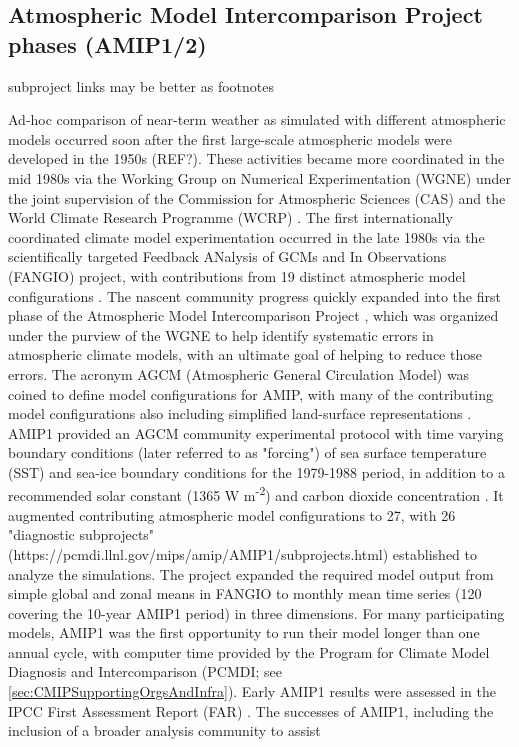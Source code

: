 \documentclass[gmd, preprint]{copernicus}
\newcommand{\mycomment}[1]{}
\def\cred#1{{\color{red}#1}}
\begin{document}
\mycomment{
1955-65: Establishment of Atmospheric General Circulation Modelling
http://pne.people.si.umich.edu/sloan/1955_65.html
Establishment of the IPCC UNEP 70th plenary meeting 6 December 1988
https://documents.un.org/doc/resolution/gen/nr0/530/32/img/nr053032.pdf?OpenElement
}

\subsection{Atmospheric Model Intercomparison Project phases (AMIP1/2)}
\label{sec:amip1And2}
\cred{subproject links may be better as footnotes}

Ad-hoc comparison of near-term weather as simulated with different atmospheric models occurred soon after the first large-scale atmospheric models were developed in the 1950s (REF?).  These activities became more coordinated in the mid 1980s via the Working Group on Numerical Experimentation (WGNE) under the joint supervision of the Commission for Atmospheric Sciences (CAS) and the World Climate Research Programme (WCRP) \citep{gates_ams_1992}. The first internationally coordinated climate model experimentation occurred in the late 1980s via the scientifically targeted Feedback ANalysis of GCMs and In Observations (FANGIO) project, with contributions from 19 distinct atmospheric model configurations \citep{cess_methodology_1988, cess_interpretation_1989, cess_intercomparison_1990, cess_first_1991}. The nascent community progress quickly expanded into the first phase of the Atmospheric Model Intercomparison Project \citep[AMIP, hereafter referred to as AMIP1;][]{gates_amip_1992}, which was organized under the purview of the WGNE to help identify systematic errors in atmospheric climate models, with an ultimate goal of helping to reduce those errors. The acronym AGCM (Atmospheric General Circulation Model) was coined to define model configurations for AMIP, with many of the contributing model configurations also including simplified land-surface representations \citep[e.g.,][]{budyko_heat_1961,manabe_climate_1969,vargas_godoy_global_2021}. AMIP1 provided an AGCM community experimental protocol with time varying boundary conditions (later referred to as "forcing") of sea surface temperature (SST) and sea-ice boundary conditions for the 1979-1988 period, in addition to a recommended solar constant (1365 W m\textsuperscript{-2}) and carbon dioxide concentration \citep[345 ppm;][]{gates_amip_1991}. It augmented contributing atmospheric model configurations to 27, with 26 "diagnostic subprojects" (https://pcmdi.llnl.gov/mips/amip/AMIP1/subprojects.html) established to analyze the simulations. The project expanded the required model output from simple global and zonal means in FANGIO to monthly mean time series (120 covering the 10-year AMIP1 period) in three dimensions. For many participating models, AMIP1 was the first opportunity to run their model longer than one annual cycle, with computer time provided by the Program for Climate Model Diagnosis and Intercomparison (PCMDI; see \autoref{sec:CMIPSupportingOrgsAndInfra}). Early AMIP1 results were assessed in the IPCC First Assessment Report (FAR) \citep{gates_validation_1990}. The successes of AMIP1, including the inclusion of a broader analysis community to assist 
\end{document}
